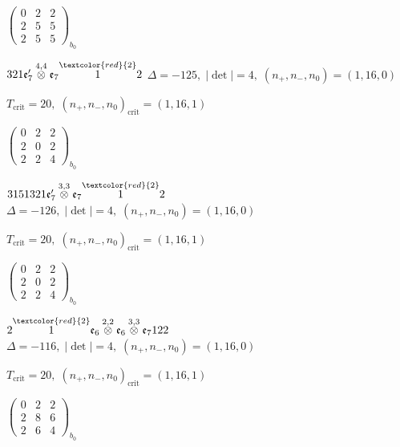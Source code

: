 \documentclass[10pt]{article}
\begin{document}
\hspace{2em}$\left(\begin{smallmatrix}0 & 2 & 2 \\ 2 & 5 & 5 \\ 2 & 5 & 5\end{smallmatrix}\right)_{\!b_0}$

\smallskip

$321\mathfrak{e}_7'\overset{4,4}{\otimes}\mathfrak{e}_7\overset{\textcolor{red}{2}}{1}2$ \quad $\Delta=-125,\; |\det|=4,\; (n_+,n_-,n_0)=(1,16,0)$

\hspace{1em}$T_{\text{crit}}=20,\; (n_+,n_-,n_0)_{\text{crit}}=(1,16,1)$

\hspace{2em}$\left(\begin{smallmatrix}0 & 2 & 2 \\ 2 & 0 & 2 \\ 2 & 2 & 4\end{smallmatrix}\right)_{\!b_0}$

\smallskip

$3151321\mathfrak{e}_7'\overset{3,3}{\otimes}\mathfrak{e}_7\overset{\textcolor{red}{2}}{1}2$ \quad $\Delta=-126,\; |\det|=4,\; (n_+,n_-,n_0)=(1,16,0)$

\hspace{1em}$T_{\text{crit}}=20,\; (n_+,n_-,n_0)_{\text{crit}}=(1,16,1)$

\hspace{2em}$\left(\begin{smallmatrix}0 & 2 & 2 \\ 2 & 0 & 2 \\ 2 & 2 & 4\end{smallmatrix}\right)_{\!b_0}$

\smallskip

$2\overset{\textcolor{red}{2}}{1}\mathfrak{e}_6\overset{2,2}{\otimes}\mathfrak{e}_6\overset{3,3}{\otimes}\mathfrak{e}_7122$ \quad $\Delta=-116,\; |\det|=4,\; (n_+,n_-,n_0)=(1,16,0)$

\hspace{1em}$T_{\text{crit}}=20,\; (n_+,n_-,n_0)_{\text{crit}}=(1,16,1)$

\hspace{2em}$\left(\begin{smallmatrix}0 & 2 & 2 \\ 2 & 8 & 6 \\ 2 & 6 & 4\end{smallmatrix}\right)_{\!b_0}$
\end{document}
